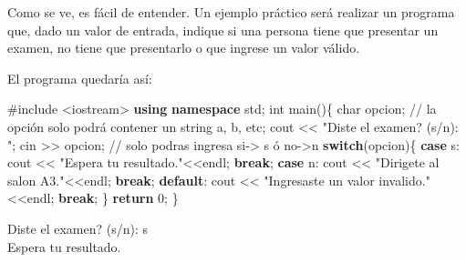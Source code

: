 \documentclass[
  11pt,
  a4paper,
  DIV=11,
  numbers=noendperiod]{scrreprt}
\newenvironment{Shaded}{\begin{snugshade}}{\end{snugshade}}
\newcommand{\CharTok}[1]{\textcolor[rgb]{0.13,0.47,0.30}{#1}}
\newcommand{\CommentTok}[1]{\textcolor[rgb]{0.37,0.37,0.37}{#1}}
\newcommand{\ControlFlowTok}[1]{\textcolor[rgb]{0.00,0.23,0.31}{\textbf{#1}}}
\newcommand{\DataTypeTok}[1]{\textcolor[rgb]{0.68,0.00,0.00}{#1}}
\newcommand{\DecValTok}[1]{\textcolor[rgb]{0.68,0.00,0.00}{#1}}
\newcommand{\ImportTok}[1]{\textcolor[rgb]{0.00,0.46,0.62}{#1}}
\newcommand{\KeywordTok}[1]{\textcolor[rgb]{0.00,0.23,0.31}{\textbf{#1}}}
\newcommand{\NormalTok}[1]{\textcolor[rgb]{0.00,0.23,0.31}{#1}}
\newcommand{\OperatorTok}[1]{\textcolor[rgb]{0.37,0.37,0.37}{#1}}
\newcommand{\PreprocessorTok}[1]{\textcolor[rgb]{0.68,0.00,0.00}{#1}}
\newcommand{\StringTok}[1]{\textcolor[rgb]{0.13,0.47,0.30}{#1}}
\begin{document}
Como se ve, es fácil de entender. Un ejemplo práctico será realizar un
programa que, dado un valor de entrada, indique si una persona tiene que
presentar un examen, no tiene que presentarlo o que ingrese un valor
válido.

El programa quedaría así:

\begin{Shaded}
\begin{Highlighting}[]
\PreprocessorTok{\#include }\ImportTok{\textless{}iostream\textgreater{}}
\KeywordTok{using} \KeywordTok{namespace}\NormalTok{ std}\OperatorTok{;}
\DataTypeTok{int}\NormalTok{ main}\OperatorTok{()\{}
    \DataTypeTok{char}\NormalTok{ opcion}\OperatorTok{;} \CommentTok{// la opción solo podrá contener un string \textquotesingle{}a\textquotesingle{}, \textquotesingle{}b\textquotesingle{}, etc;}
\NormalTok{    cout }\OperatorTok{\textless{}\textless{}} \StringTok{"Diste el examen? (s/n): "}\OperatorTok{;} 
\NormalTok{    cin }\OperatorTok{\textgreater{}\textgreater{}}\NormalTok{ opcion}\OperatorTok{;} \CommentTok{// solo podras ingresa si{-}\textgreater{} s ó no{-}\textgreater{}n}
    \ControlFlowTok{switch}\OperatorTok{(}\NormalTok{opcion}\OperatorTok{)\{}
        \ControlFlowTok{case} \CharTok{\textquotesingle{}s\textquotesingle{}}\OperatorTok{:}
\NormalTok{            cout }\OperatorTok{\textless{}\textless{}} \StringTok{"Espera tu resultado."}\OperatorTok{\textless{}\textless{}}\NormalTok{endl}\OperatorTok{;}
            \ControlFlowTok{break}\OperatorTok{;}
        \ControlFlowTok{case} \CharTok{\textquotesingle{}n\textquotesingle{}}\OperatorTok{:}
\NormalTok{            cout }\OperatorTok{\textless{}\textless{}} \StringTok{"Dirigete al salon A3."}\OperatorTok{\textless{}\textless{}}\NormalTok{endl}\OperatorTok{;}
            \ControlFlowTok{break}\OperatorTok{;}
        \ControlFlowTok{default}\OperatorTok{:}
\NormalTok{            cout }\OperatorTok{\textless{}\textless{}} \StringTok{"Ingresaste un valor invalido."}\OperatorTok{\textless{}\textless{}}\NormalTok{endl}\OperatorTok{;}
            \ControlFlowTok{break}\OperatorTok{;}
    \OperatorTok{\}}
    \ControlFlowTok{return} \DecValTok{0}\OperatorTok{;}
\OperatorTok{\}}
\end{Highlighting}
\end{Shaded}

\begin{tcolorbox}[custombox]
Diste el examen? (s/n): s \\
Espera tu resultado.
\end{tcolorbox}
\end{document}
